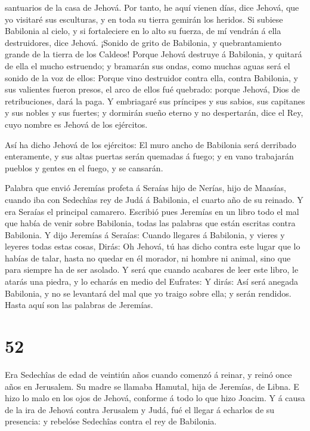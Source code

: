 santuarios de la casa de Jehová.  Por tanto, he aquí vienen
días, dice Jehová, que yo visitaré sus esculturas, y en toda su tierra
gemirán los heridos.  Si subiese Babilonia al cielo, y si
fortaleciere en lo alto su fuerza, de mí vendrán á ella destruidores,
dice Jehová.  ¡Sonido de grito de Babilonia, y
quebrantamiento grande de la tierra de los Caldeos!  Porque
Jehová destruye á Babilonia, y quitará de ella el mucho estruendo; y
bramarán sus ondas, como muchas aguas será el sonido de la voz de ellos:
 Porque vino destruidor contra ella, contra Babilonia, y
sus valientes fueron presos, el arco de ellos fué quebrado: porque
Jehová, Dios de retribuciones, dará la paga.  Y embriagaré
sus príncipes y sus sabios, sus capitanes y sus nobles y sus fuertes; y
dormirán sueño eterno y no despertarán, dice el Rey, cuyo nombre es
Jehová de los ejércitos.

 Así ha dicho Jehová de los ejércitos: El muro ancho de
Babilonia será derribado enteramente, y sus altas puertas serán quemadas
á fuego; y en vano trabajarán pueblos y gentes en el fuego, y se
cansarán.

 Palabra que envió Jeremías profeta á Seraías hijo de
Nerías, hijo de Maasías, cuando iba con Sedechîas rey de Judá á
Babilonia, el cuarto año de su reinado. Y era Seraías el principal
camarero.  Escribió pues Jeremías en un libro todo el mal
que había de venir sobre Babilonia, todas las palabras que están
escritas contra Babilonia.  Y dijo Jeremías á Seraías:
Cuando llegares á Babilonia, y vieres y leyeres todas estas cosas,
 Dirás: Oh Jehová, tú has dicho contra este lugar que lo
habías de talar, hasta no quedar en él morador, ni hombre ni animal,
sino que para siempre ha de ser asolado.  Y será que cuando
acabares de leer este libro, le atarás una piedra, y lo echarás en medio
del Eufrates:  Y dirás: Así será anegada Babilonia, y no se
levantará del mal que yo traigo sobre ella; y serán rendidos. Hasta aquí
son las palabras de Jeremías.

\hypertarget{section-51}{%
\section{52}\label{section-51}}

 Era Sedechîas de edad de veintiún años cuando comenzó á
reinar, y reinó once años en Jerusalem. Su madre se llamaba Hamutal,
hija de Jeremías, de Libna.  E hizo lo malo en los ojos de
Jehová, conforme á todo lo que hizo Joacim.  Y á causa de la
ira de Jehová contra Jerusalem y Judá, fué el llegar á echarlos de su
presencia: y rebelóse Sedechîas contra el rey de Babilonia.

